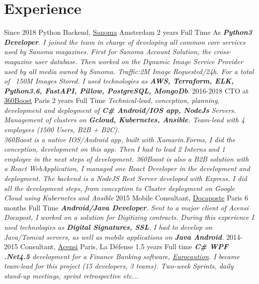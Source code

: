 \documentclass{emonides-cv}
\begin{document}
\section{Experience}
\begin{entrylist}
  \entry
    {Since 2018}
    {Python Backend, \href{https://www.sanoma.nl/over-sanoma-nl/}{Sanoma} {\normalfont Amsterdam}}
    {2 years Full Time}
    {As \emph{\textbf{Python3 Developer}. I joined the team in charge of developing all common core services used by Sanoma magazines. First for Sanoma Account Solution, the cross-magazine user database. Then worked on the Dynamic Image Service Provider used by all media owned by Sanoma. Traffic:2M Image Requested/24h. For a total of ~150M Images Stored.
    I used technologies as \textbf{AWS, Terraform, ELK, Python3.6, FastAPI, Pillow, PostgreSQL, MongoDb}.}}
  \entry
    {2016-2018}
    {CTO at \href{https://360boost.com/}{360Boost}  {\normalfont Paris}}
    {2 years Full Time}
    {\emph{Technical-lead, conception, planning, development and deployment of \textbf{C\# Android/IOS app, NodeJs} Servers.
     Management of clusters on \textbf{Gcloud, Kubernetes, Ansible}. Team-lead with 4 employees (1500 Users, B2B + B2C).
    \\360Boost is a native IOS/Android app, built with Xamarin.Forms, I did the conception, development on this app.
    Then I had to lead 2 Interns and 1 employee in the next steps of development.
    360Boost is also a B2B solution with a React WebApplication, I managed one React Developer
    in the development and deployment.
    The backend is a NodeJS Rest Server developed with Express. I did all the development steps, from conception
    to Cluster deployment on Google Cloud using Kubernetes and Ansible}}
  \entry
    {2015}
    {Mobile Consultant, \href{https://www.docapost.com/en/}{Docaposte} {\normalfont Paris}}
    {6 months Full Time}
    {\emph{\textbf{Android/Java Developer}. Sent to a major client of Acensi Docapost, I worked on a solution for Digitizing contracts.
    During this experience I used technologies as \textbf{Digital Signatures, SSL}.
    I had to develop on Java/Tomcat servers, as well as mobile applications on \textbf{Java Android}.}}
  \entry
    {2014-2015}
    {Consultant, \href{https://www.acensi.fr/}{Acensi} {\normalfont Paris, La Défense}}
    {1.5 years Full time}
    {\emph{\textbf{C\# WPF .Net4.5} development for a Finance Banking software, \href{https://www.eurocaution.net/}{Eurocaution}.
    I became team-lead for this project (15 developers, 3 teams). Two-week Sprints, daily stand-up meetings, sprint retrospective etc...
}}
\end{entrylist}
\end{document}
